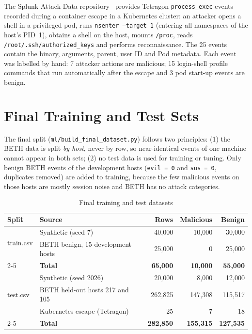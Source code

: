 The Splunk Attack Data repository~\cite{splunkattack} provides Tetragon
\texttt{process\_exec} events recorded during a container escape in a Kubernetes cluster:
an attacker opens a shell in a privileged pod, runs
\texttt{nsenter --target 1} (entering all namespaces of the host's PID~1), obtains a shell on the
host, mounts \texttt{/proc}, reads \texttt{/root/.ssh/authorized\_keys} and performs
reconnaissance. The 25 events contain the binary, arguments, parent, user ID and Pod
metadata. Each event was labelled by hand: 7 attacker actions are malicious; 15
login-shell profile commands that run automatically after the escape and 3 pod start-up
events are benign.

\section{Final Training and Test Sets}

The final split (\texttt{ml/build\_final\_dataset.py}) follows two principles:
(1) the BETH data is split \emph{by host}, never by row, so near-identical events of one
machine cannot appear in both sets; (2) no test data is used for training or tuning.
Only benign BETH events of the development hosts (\texttt{evil = 0} and
\texttt{sus = 0}, duplicates removed) are added to training, because the few malicious
events on those hosts are mostly session noise and BETH has no attack categories.

\begin{table}[H]
\centering
\caption{Final training and test datasets}
\label{tab:finalsplit}
\small
\begin{tabular}{llrrr}
\toprule
\textbf{Split} & \textbf{Source} & \textbf{Rows} & \textbf{Malicious} & \textbf{Benign} \\
\midrule
\multirow{2}{*}{train.csv} & Synthetic (seed 7) & 40,000 & 10,000 & 30,000 \\
 & BETH benign, 15 development hosts & 25,000 & 0 & 25,000 \\
\cmidrule{2-5}
 & \textbf{Total} & \textbf{65,000} & \textbf{10,000} & \textbf{55,000} \\
\midrule
\multirow{3}{*}{test.csv} & Synthetic (seed 2026) & 20,000 & 8,000 & 12,000 \\
 & BETH held-out hosts 217 and 105 & 262,825 & 147,308 & 115,517 \\
 & Kubernetes escape (Tetragon) & 25 & 7 & 18 \\
\cmidrule{2-5}
 & \textbf{Total} & \textbf{282,850} & \textbf{155,315} & \textbf{127,535} \\
\bottomrule
\end{tabular}
\end{table}

